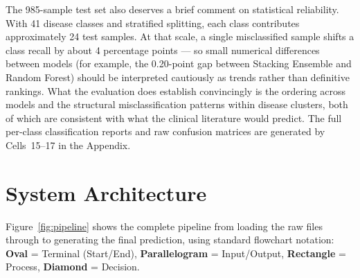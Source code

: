 \documentclass[12pt,a4paper]{article}
\begin{document}
\noindent The 985-sample test set also deserves a brief comment on statistical reliability. With 41 disease classes and stratified splitting, each class contributes approximately 24 test samples. At that scale, a single misclassified sample shifts a class recall by about 4 percentage points --- so small numerical differences between models (for example, the 0.20-point gap between Stacking Ensemble and Random Forest) should be interpreted cautiously as trends rather than definitive rankings. What the evaluation does establish convincingly is the ordering across models and the structural misclassification patterns within disease clusters, both of which are consistent with what the clinical literature would predict. The full per-class classification reports and raw confusion matrices are generated by Cells~15--17 in the Appendix.

\newpage
\section{System Architecture}

Figure~\ref{fig:pipeline} shows the complete pipeline from loading the raw files through to
generating the final prediction, using standard flowchart notation: \textbf{Oval} =
Terminal (Start/End), \textbf{Parallelogram} = Input/Output, \textbf{Rectangle} = Process,
\textbf{Diamond} = Decision.
\end{document}

